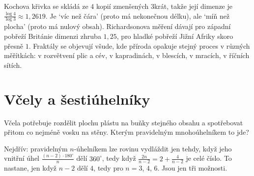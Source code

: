 \begin{center}
\end{center}

Kochova křivka se skládá ze $4$ kopií zmenšených $3$krát, takže její dimenze je $\frac{\log 4}{\log 3}\approx 1{,}2619$. Je `víc než čára' (proto má nekonečnou délku), ale `míň než plocha' (proto má nulový obsah). Richardsonova měření dávají pro západní pobřeží Británie dimenzi zhruba $1{,}25$, pro hladké pobřeží Jižní Afriky skoro přesně $1$. Fraktály se objevují všude, kde příroda opakuje stejný proces v různých měřítkách: v rozvětvení plic a cév, v kapradinách, v blescích, v mracích, v říčních sítích.

\section{Včely a šestiúhelníky}

Včela potřebuje rozdělit plochu plástu na buňky stejného obsahu a spotřebovat přitom co nejméně vosku na stěny. Kterým pravidelným mnohoúhelníkem to jde?

Nejdřív: pravidelným $n$-úhelníkem lze rovinu vydláždit jen tehdy, když jeho vnitřní úhel $\frac{(n - 2)\cdot 180^\circ}{n}$ dělí $360^\circ$, tedy když $\frac{2n}{n - 2} = 2 + \frac{4}{n - 2}$ je celé číslo. To nastane, jen když $n - 2$ dělí $4$, tedy pro $n = 3$, $4$, $6$. Jsou jen tři možnosti.

